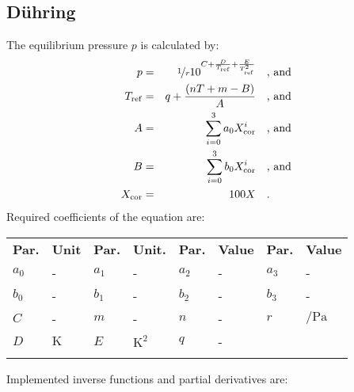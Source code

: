 \subsection{Dühring}
\label{cha:approaches:abs:con:duehring}
%
The equilibrium pressure $p$ is calculated by:
%
\begin{equation*}
	\begin{split}
		p &=& \nicefrac{1}{r} 10 ^ { C + \frac{D}{T_\mathrm{ref}} + \frac{E}{T_\mathrm{ref}^{2}} } & \quad\text{, and} \\
		T_\mathrm{ref} &=& q + \frac{\left( n T + m - B \right)}{A}  & \quad\text{, and} \\
		A &=& \sum_{i=0}^{3} a_0 X_\mathrm{cor} ^{i}  & \quad\text{, and} \\
		B &=& \sum_{i=0}^{3} b_0 X_\mathrm{cor} ^{i}  & \quad\text{, and} \\
		X_\mathrm{cor} &=& 100 X  & \quad\text{.} \\
	\end{split}
\end{equation*}
%
Required coefficients of the equation are:
%
\begin{longtable}[l]{ll|ll|ll|ll}
\toprule
\addlinespace
\textbf{Par.} & \textbf{Unit} & \textbf{Par.} &	\textbf{Unit.} & \textbf{Par.} & \textbf{Value} & \textbf{Par.} & \textbf{Value} \\
\addlinespace
\midrule
\endhead

\bottomrule
\endfoot
\bottomrule
\endlastfoot
\addlinespace

$a_0$ & - &$a_1$ & - &$a_2$ & - &$a_3$ & - \\
$b_0$ & - &$b_1$ & - &$b_2$ & - &$b_3$ & - \\
$C$ & - &$m$ & - &$n$ & - &$r$ & $\si{\per\pascal}$ \\
$D$ & $\si{\kelvin}$ & $E$ &$\si{\square\kelvin}$ & $q$ & - & &  \\

\addlinespace
\end{longtable}
%
Implemented inverse functions and partial derivatives are:
%
